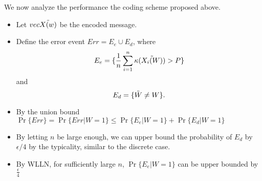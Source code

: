 \documentclass[../main.tex]{subfiles}
\begin{document}
We now analyze the performance the coding scheme proposed above.
\begin{itemize}
    \item Let $vec{\Tilde{X(w)}}$ be the encoded message.
    \item Define the error event $Err=E_e\cup E_d$, where \[
    E_e =\{\frac{1}{n}\sum_{i=1}^n\kappa(\Tilde{X_i(W)})>P\}
    \] and \[
    E_d =\{\Tilde{W}\neq W\}.
    \]
    \item By the union bound $\Pr\{Err\}=\Pr\{Err|W=1\}\leq \Pr\{E_e|W=1\} + \Pr\{E_d|W=1\}$
    \item By letting $n$ be large enough, we can upper bound the probability of $E_d$ by $\epsilon/4$ by the typicality, similar to the discrete case.
    \item By WLLN, for sufficiently large $n$, $\Pr\{E_e|W=1\}$ can be upper bounded by $\frac{\epsilon}{4}$
\end{itemize}
\end{document}

